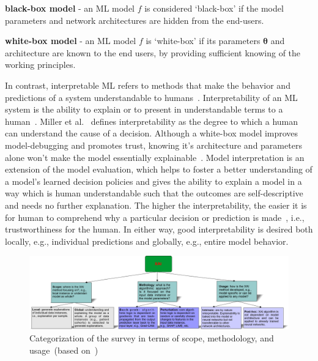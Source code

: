 \begin{definition}
    \textbf{black-box model} - an ML model $f$ is considered `black-box' if the model parameters and network architectures are hidden from the end-users. 
\end{definition}

\begin{definition}
    \textbf{white-box model} - an ML model $f$ is `white-box' if its parameters $\boldsymbol{\theta}$ and architecture are known to the end users, by providing sufficient knowing of the working principles. %
\end{definition}

\hspace*{3.5mm} In contrast, interpretable ML refers to methods that make the behavior and predictions of a system understandable to humans~\cite{molnar2019interpretable}. 
Interpretability of an ML system is the ability to explain or to present in understandable terms to a human~\cite{doshi2017towards}. Miller et al.~\cite{XAI_miller} defines interpretability as the degree to which a human can understand the cause of a decision. Although a white-box model improves model-debugging and promotes trust, knowing it's architecture and parameters alone won't make the model essentially explainable~\cite{das2020opportunities}.  
Model interpretation is an extension of the model evaluation, which helps to foster a better understanding of a model’s learned decision policies and gives the ability to explain a model in a way which is human understandable such that the outcomes are self-descriptive and needs no further explanation. 
The higher the interpretability, the easier it is for human to comprehend why a particular decision or prediction is made~\cite{stiglic2020interpretability,bhatt2020explainable}, i.e., trustworthiness for the human. In either way, good interpretability is desired both locally, e.g., individual predictions and globally, e.g., entire model behavior. 

\begin{figure}[h]
	\centering
	\includegraphics[scale=0.55]{images/xai_tec.png}	
    \caption{Categorization of the survey in terms of scope, methodology, and usage~(based on~\cite{das2020opportunities})}	
	\label{fig:survey_xai}
\end{figure}

